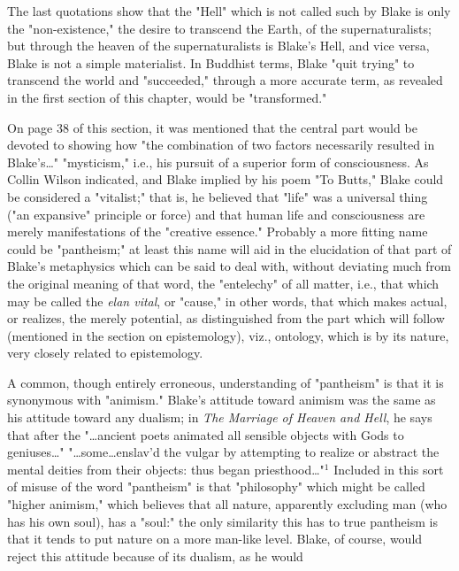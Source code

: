 The last quotations show that the "Hell" which is not called such by Blake is only the
"non-existence," the desire to transcend the Earth, of the supernaturalists; but through the
heaven of the supernaturalists is Blake's Hell, and vice versa, Blake is not a simple materialist. In Buddhist terms,
Blake "quit trying" to transcend the world and "succeeded," through a more accurate term,
as revealed in the first section of this chapter, would be "transformed."\par
\vspace*{0.5\baselineskip}
On page 38 of this section, it was mentioned that the central part would be devoted
to showing how "the combination of two factors necessarily resulted in Blake's\dots" "mysticism," i.e., his
pursuit of a superior form of consciousness. As Collin Wilson indicated, and Blake implied by
his poem "To Butts," Blake could be considered a "vitalist;" that is, he believed that "life" was a universal
thing ("an expansive" principle or force) and that human life and consciousness are merely
manifestations of the "creative essence." Probably a more fitting name could be "pantheism;" at least
this name will aid in the elucidation of that part of Blake's metaphysics which can be said to deal with,
without deviating much from the original meaning of that word, the "entelechy" of all matter, i.e., that
which may be called the \textit{elan vital}, or "cause," in other words, that which makes actual,
or realizes, the merely potential, as distinguished from the part which will follow (mentioned in the section on
epistemology), viz., ontology, which is by its nature, very closely related to epistemology.\par
\vspace*{0.5\baselineskip}
A common, though entirely erroneous, understanding of "pantheism" is that it is synonymous with "animism." Blake's
attitude toward animism was the same as his attitude toward any dualism; in \textit{The Marriage of Heaven and Hell}, he says
that after the "\dots ancient poets animated all sensible objects with Gods to geniuses\dots" "\dots some\dots enslav'd the vulgar
by attempting to realize or abstract the mental deities from their objects: thus began priesthood\dots"$^{1}$ Included in this sort of misuse
of the word "pantheism" is that "philosophy" which might be called "higher animism," which believes that all nature,
apparently excluding man (who has his own soul), has a "soul:" the only similarity this has to true pantheism is that it
tends to put nature on a more man-like level. Blake, of course, would reject this attitude because of its dualism, as he would
